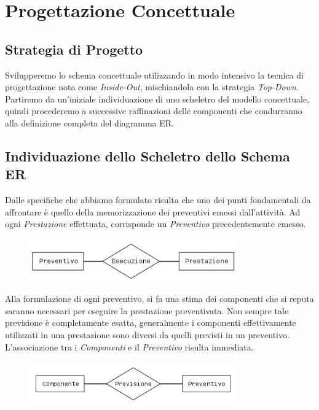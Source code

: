 \section{Progettazione Concettuale}
	
	\subsection{Strategia di Progetto}
		
		Svilupperemo lo schema concettuale utilizzando in modo intensivo la tecnica di progettazione nota come \emph{Inside-Out}, mischiandola con la strategia \emph{Top-Down}. Partiremo da un'iniziale individuazione di uno scheletro del modello concettuale, quindi procederemo a successive raffinazioni delle componenti che condurranno alla definizione completa del diagramma ER.
		
	\subsection{Individuazione dello Scheletro dello Schema ER}
		
		Dalle specifiche che abbiamo formulato risulta che uno dei punti fondamentali da affrontare è quello della memorizzazione dei preventivi emessi dall'attività.
		Ad ogni \emph{Prestazione} effettuata, corrisponde un \emph{Preventivo} precedentemente emesso.
		
		\begin{figure}[H]
			\centering
			\includegraphics[width=9cm]{images/diagrams/preventivo_prestazione.png}
		\end{figure}
		
		Alla formulazione di ogni preventivo, si fa una stima dei componenti che si reputa saranno necessari per eseguire la prestazione preventivata. Non sempre tale previsione è completamente esatta, generalmente i componenti effettivamente utilizzati in una prestazione sono diversi da quelli previsti in un preventivo.
		L'associazione tra i \emph{Componenti} e il \emph{Preventivo} risulta immediata.
		
		\begin{figure}[H]
			\centering
			\includegraphics[width=9cm]{images/diagrams/preventivo_componente.png}
		\end{figure}
		
